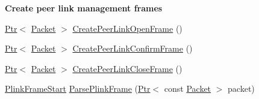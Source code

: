\begin{Indent}{\bf Create peer link management frames}\par
\begin{DoxyCompactItemize}
\item 
\hyperlink{classns3_1_1Ptr}{Ptr}$<$ \hyperlink{classns3_1_1Packet}{Packet} $>$ \hyperlink{classns3_1_1dot11s_1_1PeerManagementProtocolMac_a3d2eeec69a8179cdf8bfa1f92b979010}{Create\+Peer\+Link\+Open\+Frame} ()
\item 
\hyperlink{classns3_1_1Ptr}{Ptr}$<$ \hyperlink{classns3_1_1Packet}{Packet} $>$ \hyperlink{classns3_1_1dot11s_1_1PeerManagementProtocolMac_a9820179039c93ef3773cddf02c3fc26d}{Create\+Peer\+Link\+Confirm\+Frame} ()
\item 
\hyperlink{classns3_1_1Ptr}{Ptr}$<$ \hyperlink{classns3_1_1Packet}{Packet} $>$ \hyperlink{classns3_1_1dot11s_1_1PeerManagementProtocolMac_a72d69e2684162fd61659a03da35cfcf3}{Create\+Peer\+Link\+Close\+Frame} ()
\item 
\hyperlink{structns3_1_1dot11s_1_1PeerManagementProtocolMac_1_1PlinkFrameStart}{Plink\+Frame\+Start} \hyperlink{classns3_1_1dot11s_1_1PeerManagementProtocolMac_ab5395cf6a234acc5b4a9b8eb7ede141f}{Parse\+Plink\+Frame} (\hyperlink{classns3_1_1Ptr}{Ptr}$<$ const \hyperlink{classns3_1_1Packet}{Packet} $>$ packet)
\end{DoxyCompactItemize}
\end{Indent}

